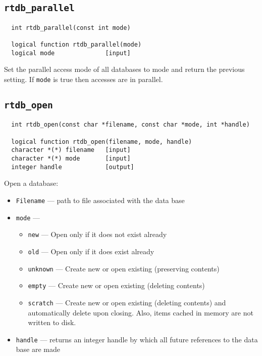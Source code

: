 \subsection{{\tt rtdb\_parallel}}
\begin{verbatim}
  int rtdb_parallel(const int mode)

  logical function rtdb_parallel(mode)
  logical mode              [input]
\end{verbatim}
Set the parallel access mode of all databases to mode and return the
previous setting. If {\tt mode} is true then accesses are in parallel.

\subsection{{\tt rtdb\_open}}
\begin{verbatim}
  int rtdb_open(const char *filename, const char *mode, int *handle)

  logical function rtdb_open(filename, mode, handle)
  character *(*) filename   [input]
  character *(*) mode       [input]
  integer handle            [output]
\end{verbatim}
Open a database:
\begin{itemize}
\item    {\tt Filename} --- path to file associated with the data base
\item    {\tt mode} ---
\begin{itemize}
\item {\tt new} ---  Open only if it does not exist already
\item {\tt old} ---  Open only if it does exist already
\item {\tt unknown} --- Create new or open existing (preserving contents)
\item {\tt empty} --- Create new or open existing (deleting contents)
\item {\tt scratch} --- Create new or open existing (deleting contents)
                         and automatically delete upon closing.  Also, items
                         cached in memory are not written to disk.
\end{itemize}
\item {\tt handle} --- returns an integer handle by which all future
  references to the data base are made
\end{itemize}

